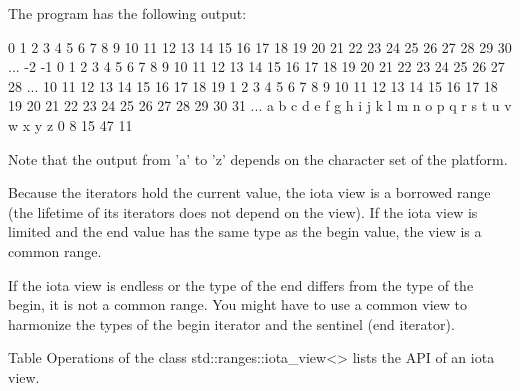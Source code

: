 The program has the following output:

\begin{shell}
0 1 2 3 4 5 6 7 8 9 10 11 12 13 14 15 16 17 18 19 20 21 22 23 24 25 26 27 28 29 30 ...
-2 -1 0 1 2 3 4 5 6 7 8 9 10 11 12 13 14 15 16 17 18 19 20 21 22 23 24 25 26 27 28 ...
10 11 12 13 14 15 16 17 18 19
1 2 3 4 5 6 7 8 9 10 11 12 13 14 15 16 17 18 19 20 21 22 23 24 25 26 27 28 29 30 31 ...
a b c d e f g h i j k l m n o p q r s t u v w x y z
0 8 15 47 11	
\end{shell}

Note that the output from ’a’ to ’z’ depends on the character set of the platform.


Because the iterators hold the current value, the iota view is a borrowed range (the lifetime of its iterators does not depend on the view). If the iota view is limited and the end value has the same type as the begin value, the view is a common range.

If the iota view is endless or the type of the end differs from the type of the begin, it is not a common range. You might have to use a common view to harmonize the types of the begin iterator and the sentinel (end iterator).


Table Operations of the class std::ranges::iota\_view<> lists the API of an iota view.


